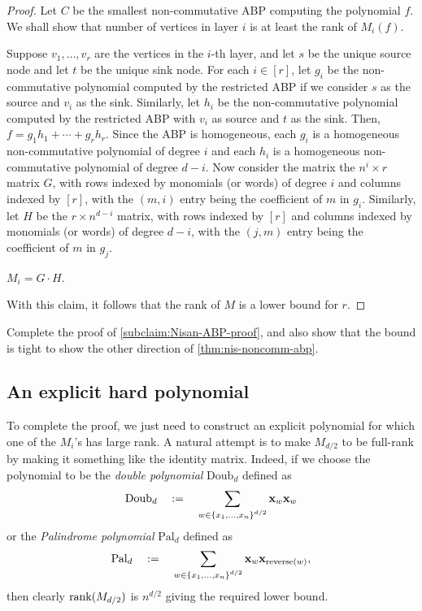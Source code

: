 \begin{proof}
Let $C$ be the smallest non-commutative ABP computing the polynomial $f$. We shall show that number of vertices in layer $i$ is at least the rank of $M_i(f)$. 

Suppose $v_1,\ldots, v_r$ are the vertices in the $i$-th layer, and let $s$ be the unique source node and let $t$ be the unique sink node.
For each $i \in [r]$, let $g_i$ be the non-commutative polynomial computed by the restricted ABP if we consider $s$ as the source and $v_i$ as the sink.
Similarly, let $h_i$ be the non-commutative polynomial computed by the restricted ABP with $v_i$ as source and $t$ as the sink.
Then, $f = g_1 h_1 + \cdots + g_r h_r$.
Since the ABP is homogeneous, each $g_i$ is a homogeneous non-commutative polynomial of degree $i$ and each $h_i$ is a homogeneous non-commutative polynomial of degree $d-i$.
Now consider the matrix the $n^i \times r$ matrix $G$, with rows indexed by monomials (or words) of degree $i$ and columns indexed by $[r]$, with the $(m,i)$ entry being the coefficient of $m$ in $g_i$.
Similarly, let $H$ be the $r \times n^{d-i}$ matrix, with rows indexed by $[r]$ and columns indexed by monomials (or words) of degree $d-i$, with the $(j,m)$ entry being the coefficient of $m$ in $g_j$.
\begin{subclaim}\label{subclaim:Nisan-ABP-proof}
$M_i = G \cdot H$. 
\end{subclaim}
\noindent 
With this claim, it follows that the rank of $M$ is a lower bound for $r$. 
\end{proof}

\begin{exercise}
Complete the proof of  \autoref{subclaim:Nisan-ABP-proof}, and also show that the bound is tight to show the other direction of \autoref{thm:nis-noncomm-abp}. 
\end{exercise}

\subsection{An explicit hard polynomial}

To complete the proof, we just need to construct an explicit polynomial for which one of the $M_i$'s has large rank.
A natural attempt is to make $M_{d/2}$ to be full-rank by making it something like the identity matrix.
Indeed, if we choose the polynomial to be the \emph{double polynomial} $\mathrm{Doub}_d$ defined as
\[
\mathrm{Doub}_d \quad := \quad \sum_{w\in \left\{x_1, \ldots, x_n\right\}^{d/2}} \mathbf{x}_{w} \mathbf{x}_w
\]
or the \emph{Palindrome polynomial} $\mathrm{Pal}_d$ defined as
\[
\mathrm{Pal}_d \quad := \quad \sum_{w\in \left\{x_1, \ldots, x_n\right\}^{d/2}} \mathbf{x}_{w} \mathbf{x}_{\mathrm{reverse}(w)},
\]
then clearly $\operatorname{rank}(M_{d/2})$ is $n^{d/2}$ giving the required lower bound. 

